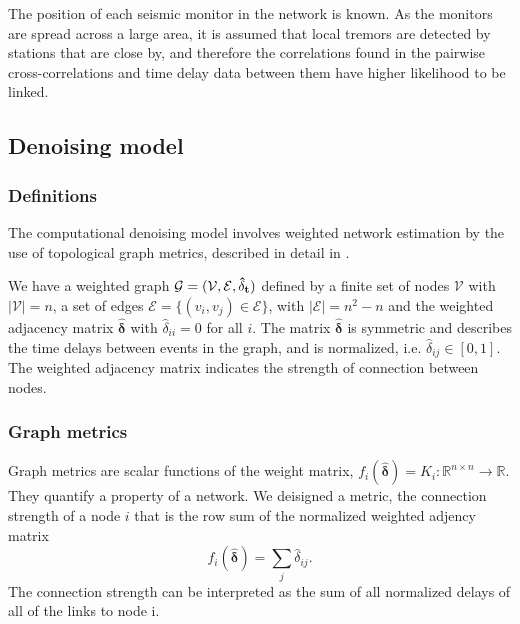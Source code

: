 \documentclass[12pt,a4paper,english]{article}
\begin{document}
The position of each seismic monitor in the network is known. As the monitors are spread across a large area, it is assumed that local tremors are detected by stations that are close by, and therefore the correlations found in the pairwise cross-correlations and time delay data between them have higher likelihood to be linked. 

\subsection{Denoising model}\label{sec:denoising}
\subsubsection{Definitions}
The computational denoising model involves weighted network estimation by the use of topological graph metrics, described in detail in \cite{Spyrou2017}. 

We have a weighted graph $\mathcal{G} = (\mathcal{V}, \mathcal{E}, \bf{\hat{\delta}}_t)$ defined by a finite set of nodes $\mathcal{V}$ with $|\mathcal{V}| = n$, a set of edges $\mathcal{E} = \{ (v_i,v_j) \in \mathcal{E} \}$, with $|\mathcal{E}| = n^2-n$ and the weighted adjacency matrix $\bm{\hat{\delta}}$ with $\hat{\delta}_{ii} = 0$ for all $i$. The matrix $\bm{\hat{\delta}}$  is symmetric and describes the time delays between events in the graph, and is normalized, i.e. $\hat{\delta}_{ij}\in [0,1]$. The weighted adjacency matrix indicates the strength of connection between nodes. %

\subsubsection{Graph metrics}
Graph metrics are scalar functions of the weight matrix, $f_i(\bm{\hat{\delta}})=K_i: \mathbb{R}^{n \times n}\rightarrow \mathbb{R}$. They quantify a property of a network. We deisigned a metric, the connection strength of a node $i$ that is the row sum of the normalized weighted adjency matrix 
\begin{equation}
f_i (\bm{\hat{\delta}})= \sum_j{\hat{\delta}_{ij}}.  
\end{equation}
The connection strength can be interpreted as the sum of all normalized delays of all of the links to node i.
\end{document}
